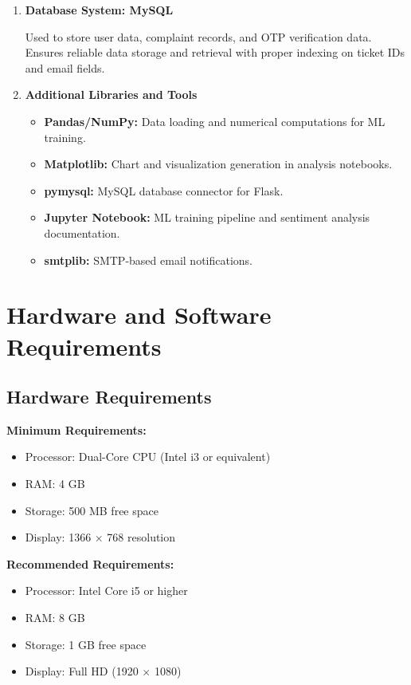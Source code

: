 \documentclass[12pt,a4paper]{report}
\begin{document}
\begin{enumerate}[nolistsep]
    Used to run Apache server and MySQL database locally. Allows testing of the web application in a local environment before deployment.
    
    \item \textbf{Database System: MySQL}
    
    Used to store user data, complaint records, and OTP verification data. Ensures reliable data storage and retrieval with proper indexing on ticket IDs and email fields.
    
    \item \textbf{Additional Libraries and Tools}
    
    \begin{itemize}[nolistsep]
        \item \textbf{Pandas/NumPy:} Data loading and numerical computations for ML training.
        \item \textbf{Matplotlib:} Chart and visualization generation in analysis notebooks.
        \item \textbf{pymysql:} MySQL database connector for Flask.
        \item \textbf{Jupyter Notebook:} ML training pipeline and sentiment analysis documentation.
        \item \textbf{smtplib:} SMTP-based email notifications.
    \end{itemize}
\end{enumerate}

\section{Hardware and Software Requirements}

\subsection{Hardware Requirements}

\textbf{Minimum Requirements:}
\begin{itemize}[nolistsep]
    \item Processor: Dual-Core CPU (Intel i3 or equivalent)
    \item RAM: 4 GB
    \item Storage: 500 MB free space
    \item Display: 1366 $\times$ 768 resolution
\end{itemize}

\textbf{Recommended Requirements:}
\begin{itemize}[nolistsep]
    \item Processor: Intel Core i5 or higher
    \item RAM: 8 GB
    \item Storage: 1 GB free space
    \item Display: Full HD (1920 $\times$ 1080)
\end{itemize}
\end{document}
